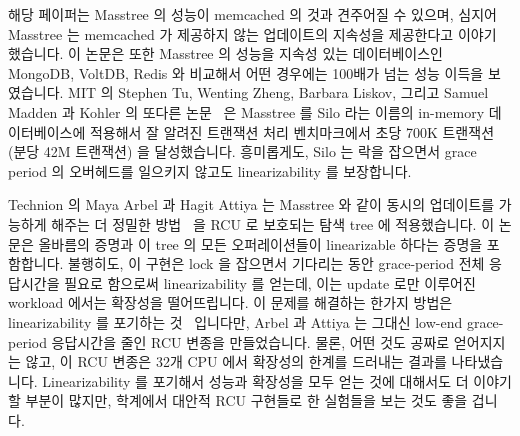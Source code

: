 해당 페이퍼는 Masstree 의 성능이 memcached 의 것과 견주어질 수 있으며, 심지어
Masstree 는 memcached 가 제공하지 않는 업데이트의 지속성을 제공한다고 이야기
했습니다.
이 논문은 또한 Masstree 의 성능을 지속성 있는 데이터베이스인 MongoDB, VoltDB,
Redis 와 비교해서 어떤 경우에는 100배가 넘는 성능 이득을 보였습니다.
MIT 의 Stephen Tu, Wenting Zheng, Barbara Liskov, 그리고 Samuel Madden 과
Kohler 의 또다른 논문~\cite{Tu:2013:STM:2517349.2522713} 은 Masstree 를 Silo
라는 이름의 in-memory 데이터베이스에 적용해서 잘 알려진 트랜잭션 처리
벤치마크에서 초당 700K 트랜잭션 (분당 42M 트랜잭션) 을 달성했습니다.
흥미롭게도, Silo 는 락을 잡으면서 grace period 의 오버헤드를 일으키지 않고도
linearizability 를 보장합니다.
\iffalse

Yandong Mao and Robert Morris of MIT and Eddie Kohler of
Harvard University created another RCU-protected tree named
Masstree~\cite{Mao:2012:CCF:2168836.2168855} that combines ideas from B+
trees and tries.
Although this tree is about 2.5x slower than an RCU-protected hash table,
it supports operations on key ranges, unlike hash tables.
In addition, Masstree supports efficient storage of objects with long
shared key prefixes and, furthermore, provides persistence via logging
to mass storage.

The paper notes that Masstree's performance rivals that of memcached, even
given that Masstree is persistently storing updates and memcached is not.
The paper also compares Masstree's performance to the persistent
datastores MongoDB, VoltDB, and Redis, reporting significant performance
advantages for Masstree, in some cases exceeding two orders of magnitude.
Another paper~\cite{Tu:2013:STM:2517349.2522713}, by Stephen Tu,
Wenting Zheng, Barbara Liskov, and Samuel Madden of MIT and Kohler,
applies Masstree to an in-memory database named Silo, achieving 700K
transactions per second (42M transactions per minute) on a well-known
transaction-processing benchmark.
Interestingly enough, Silo guarantees linearizability without incurring
the overhead of grace periods while holding locks.
\fi

Technion 의 Maya Arbel 과 Hagit Attiya 는 Masstree 와 같이 동시의 업데이트를
가능하게 해주는 더 정밀한 방법~\cite{MayaArbel2014RCUtree} 을 RCU 로 보호되는
탐색 tree 에 적용했습니다.
이 논문은 올바름의 증명과 이 tree 의 모든 오퍼레이션들이 linearizable 하다는
증명을 포함합니다.
불행히도, 이 구현은 lock 을 잡으면서 기다리는 동안 grace-period 전체 응답시간을
필요로 함으로써 linearizability 를 얻는데, 이는 update 로만 이루어진 workload
에서는 확장성을 떨어뜨립니다.
이 문제를 해결하는 한가지 방법은 linearizability 를 포기하는
것~\cite{AndreasHaas2012FIFOisnt,PaulEMcKennneyAtomicTreeN4037} 입니다만, Arbel
과 Attiya 는 그대신 low-end grace-period 응답시간을 줄인 RCU 변종을
만들었습니다.
물론, 어떤 것도 공짜로 얻어지지는 않고, 이 RCU 변종은 32개 CPU 에서 확장성의
한계를 드러내는 결과를 나타냈습니다.
Linearizability 를 포기해서 성능과 확장성을 모두 얻는 것에 대해서도 더 이야기
할 부분이 많지만, 학계에서 대안적 RCU 구현들로 한 실험들을 보는 것도 좋을
겁니다.
\iffalse

